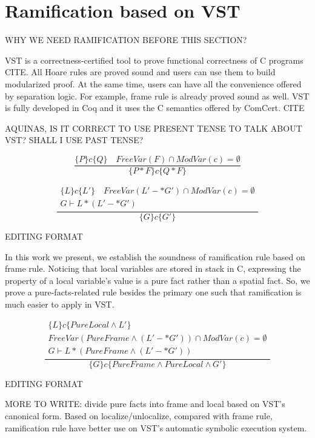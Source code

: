 \documentclass[pldi]{sigplanconf-pldi15}
\begin{document}
\section{Ramification based on VST}

WHY WE NEED RAMIFICATION BEFORE THIS SECTION?

VST is a correctness-certified tool to prove functional correctness of C programs CITE. All Hoare rules are proved sound and users can use them to build modularized proof. At the same time, users can have all the convenience offered by separation logic. For example, frame rule is already proved sound as well. VST is fully developed in Coq and it uses the C semantics offered by ComCert. CITE

AQUINAS, IS IT CORRECT TO USE PRESENT TENSE TO TALK ABOUT VST? SHALL I USE PAST TENSE?

$$ \frac{\{ P \} c \{Q \} \quad FreeVar(F) \cap ModVar(c) = \emptyset } {\{P * F \} c \{ Q * F \}} $$

\[
\frac{
\begin{array}{c}
\{ L \} c \{L' \} \quad FreeVar(L' -* G') \cap ModVar(c) = \emptyset \\
G \vdash L * (L' -* G')
\end{array}
}
{\{G \} c \{ G' \}}
\]

EDITING FORMAT

In this work we present, we establish the soundness of ramification rule based on frame rule. Noticing that local variables are stored in stack in C, expressing the property of a local variable's value is a pure fact rather than a spatial fact. So, we prove a pure-facts-related rule besides the primary one such that ramification is much easier to apply in VST.

\[
\frac
{
\begin{array}{c}
\{ L \} c \{PureLocal \wedge L' \} \\ 
FreeVar(PureFrame \wedge (L' -* G')) \cap ModVar(c) = \emptyset \\
G \vdash L * (PureFrame \wedge (L' -* G'))
\end{array}
} {\{G \} c \{ PureFrame \wedge PureLocal \wedge G' \}}
\]

EDITING FORMAT


MORE TO WRITE: divide pure facts into frame and local based on VST's canonical form. Based on localize/unlocalize, compared with frame rule, ramification rule have better use on VST's automatic symbolic execution system.
\end{document}
